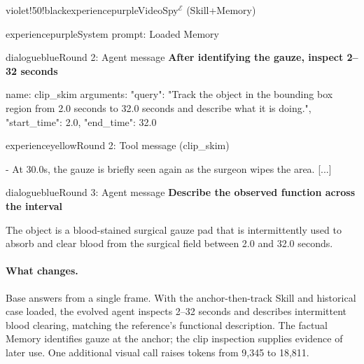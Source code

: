 \begin{ExecutionBox}[breakable,title after break={VideoSpy$^{\mathcal{E}}$ (Skill+Memory, continued)}]{violet!50!black}{experiencepurple}{VideoSpy$^{\mathcal{E}}$ (Skill+Memory)}
\begin{MessageBox}{experiencepurple}{System prompt: Loaded Memory}
\begin{Trajectory}
[...]
\end{Trajectory}
\end{MessageBox}
\begin{MessageBox}[agent message,frame hidden,borderline={1pt}{0pt}{changeaccent,dash pattern=on 3pt off 2pt},colbacktitle=red!4]{dialogueblue}{Round 2: Agent message}
\noindent\textcolor{changeaccent}{\textbf{After identifying the gauze, inspect 2--32 seconds}}\par
\begin{Trajectory}
name: clip_skim  arguments: {"query": "Track the object in the bounding box region from 2.0 seconds to 32.0 seconds and describe what it is doing.", "start_time": 2.0, "end_time": 32.0}
\end{Trajectory}
\end{MessageBox}
\begin{MessageBox}{experienceyellow}{Round 2: Tool message (clip\_skim)}
\begin{Trajectory}
[...] - At 30.0s, the gauze is briefly seen again as the surgeon wipes the area. [...]
\end{Trajectory}
\end{MessageBox}
\begin{MessageBox}[agent message,frame hidden,borderline={1pt}{0pt}{changeaccent,dash pattern=on 3pt off 2pt},colbacktitle=red!4]{dialogueblue}{Round 3: Agent message}
\noindent\textcolor{changeaccent}{\textbf{Describe the observed function across the interval}}\par
\begin{Trajectory}
The object is a blood-stained surgical gauze pad that is intermittently used to absorb and clear blood from the surgical field between 2.0 and 32.0 seconds.
\end{Trajectory}
\end{MessageBox}
\end{ExecutionBox}

\paragraph{What changes.}
Base answers from a single frame. With the anchor-then-track Skill and historical case loaded, the evolved agent inspects 2--32 seconds and describes intermittent blood clearing, matching the reference's functional description. The factual Memory identifies gauze at the anchor; the clip inspection supplies evidence of later use. One additional visual call raises tokens from 9,345 to 18,811.
\bigskip
